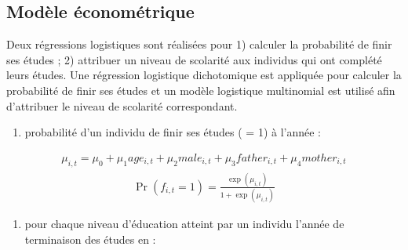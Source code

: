 \documentclass[letterpaper,10pt,french]{sphinxmanual}
\begin{document}
\subsection{Modèle économétrique}
\label{\detokenize{methodologie:model2}}\label{\detokenize{methodologie:id1}}
Deux régressions logistiques sont réalisées pour 1) calculer la probabilité de finir ses études ; 2) attribuer un niveau de scolarité aux individus qui ont complété leurs études.
Une régression logistique dichotomique est appliquée pour calculer la probabilité de finir ses études et un modèle logistique multinomial est utilisé afin d’attribuer le niveau de scolarité correspondant.
\begin{enumerate}
%
\item {} 
probabilité d’un individu  de finir ses études ( = 1) à l’année  :

\end{enumerate}
\begin{equation*}
\begin{split}\mu_{i,t} = \mu_{0} + \mu_{1} age_{i,t} + \mu_{2} male_{i,t} + \mu_{3} father_{i,t} + \mu_{4} mother_{i,t}\end{split}
\end{equation*}\begin{equation*}
\begin{split}\Pr(f_{i,t}=1) = \frac{\exp(\mu_{i,t})}{1+\exp(\mu_{i,t})}\end{split}
\end{equation*}\begin{enumerate}
%
\setcounter{enumi}{1}
\item {} 
pour chaque niveau d’éducation  atteint par un individu  l’année de terminaison des études en  :

\end{enumerate}
\end{document}
